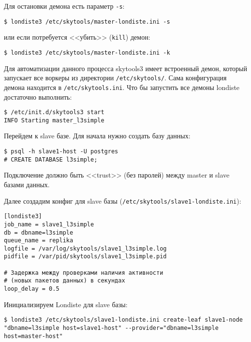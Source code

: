 Для остановки демона есть параметр \lstinline!-s!:

\begin{lstlisting}[label=lst:londiste-replica5,caption=Остановка демона]
$ londiste3 /etc/skytools/master-londiste.ini -s
\end{lstlisting}

или если потребуется <<убить>> (\lstinline!kill!) демон:

\begin{lstlisting}[label=lst:londiste-replica6,caption=Остановка демона]
$ londiste3 /etc/skytools/master-londiste.ini -k
\end{lstlisting}

Для автоматизации данного процесса skytools3 имеет встроенный демон, который запускает все воркеры из директории \lstinline!/etc/skytools/!. Сама конфигурация демона находится в \lstinline!/etc/skytools.ini!. Что бы запустить все демоны londiste достаточно выполнить:

\begin{lstlisting}[label=lst:londiste-replica7,caption=Демон для ticker]
$ /etc/init.d/skytools3 start
INFO Starting master_l3simple
\end{lstlisting}

Перейдем к slave базе. Для начала нужно создать базу данных:

\begin{lstlisting}[label=lst:londiste-replica8,caption=Копирования структуры базы]
$ psql -h slave1-host -U postgres
# CREATE DATABASE l3simple;
\end{lstlisting}

Подключение должно быть <<trust>> (без паролей) между master и slave базами данных.

Далее создадим конфиг для slave базы (\lstinline!/etc/skytools/slave1-londiste.ini!):

\begin{lstlisting}[label=lst:londiste-replica9,caption=Создаём конфигурацию для slave]
[londiste3]
job_name = slave1_l3simple
db = dbname=l3simple
queue_name = replika
logfile = /var/log/skytools/slave1_l3simple.log
pidfile = /var/pid/skytools/slave1_l3simple.pid

# Задержка между проверками наличия активности
# (новых пакетов данных) в секундах
loop_delay = 0.5
\end{lstlisting}

Инициализируем Londiste для slave базы:

\begin{lstlisting}[label=lst:londiste-replica10,caption=Инициализируем Londiste для slave]
$ londiste3 /etc/skytools/slave1-londiste.ini create-leaf slave1-node "dbname=l3simple host=slave1-host" --provider="dbname=l3simple host=master-host"
\end{lstlisting}

